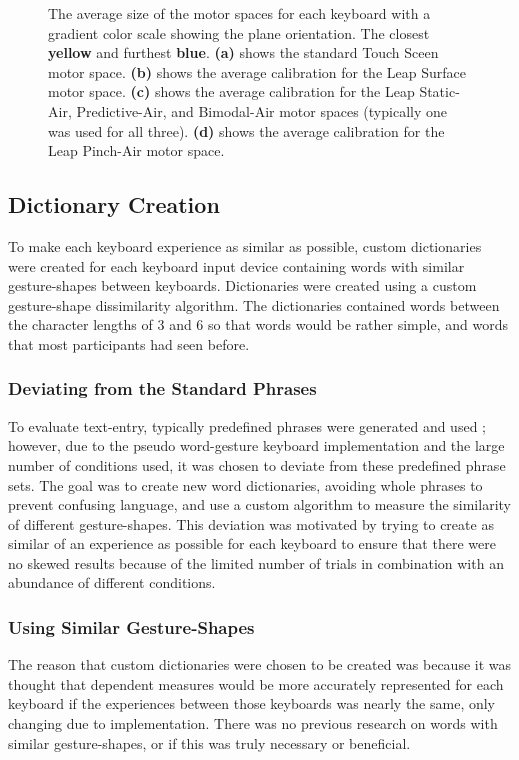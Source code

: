 \begin{figure}[h]
\begin{minipage}[t]{2.5in}
		\label{fig_calibration_pinch}
	\end{minipage}
	\caption[Motor Space Comparison]{The average size of the motor spaces for each keyboard with a gradient color scale showing the plane orientation. The closest \textbf{yellow} and furthest \textbf{blue}. \textbf{(a)} shows the standard Touch Sceen motor space. \textbf{(b)} shows the average calibration for the Leap Surface motor space. \textbf{(c)} shows the average calibration for the Leap Static-Air, Predictive-Air, and Bimodal-Air motor spaces (typically one was used for all three). \textbf{(d)} shows the average calibration for the Leap Pinch-Air motor space.}
	\label{motor_space_size}
\end{figure}

\subsection{Dictionary Creation} \label{dictionary_creation}
To make each keyboard experience as similar as possible, custom dictionaries were created for each keyboard input device containing words with similar gesture-shapes between keyboards. Dictionaries were created using a custom gesture-shape dissimilarity algorithm. The dictionaries contained words between the character lengths of 3 and 6 so that words would be rather simple, and words that most participants had seen before.

\subsubsection{Deviating from the Standard Phrases}
To evaluate text-entry, typically predefined phrases were generated and used \cite{ref_phrase_sets}; however, due to the pseudo word-gesture keyboard implementation and the large number of conditions used, it was chosen to deviate from these predefined phrase sets. The goal was to create new word dictionaries, avoiding whole phrases to prevent confusing language, and use a custom algorithm to measure the similarity of different gesture-shapes. This deviation was motivated by trying to create as similar of an experience as possible for each keyboard to ensure that there were no skewed results because of the limited number of trials in combination with an abundance of different conditions.

\subsubsection{Using Similar Gesture-Shapes}
The reason that custom dictionaries were chosen to be created was because it was thought that dependent measures would be more accurately represented for each keyboard if the experiences between those keyboards was nearly the same, only changing due to implementation. There was no previous research on words with similar gesture-shapes, or if this was truly necessary or beneficial.

